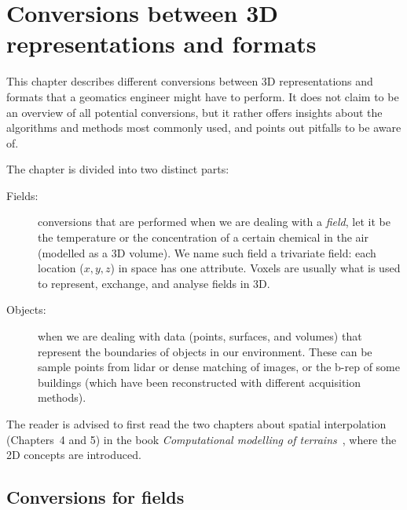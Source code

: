 
\setchapterpreamble[u]{\margintoc}

\graphicspath{{conversion/}}

\chapter{Conversions between 3D representations and formats}%
\label{chap:conversion}

This chapter describes different conversions between 3D representations and formats that a geomatics engineer might have to perform.
It does not claim to be an overview of all potential conversions, but it rather offers insights about the algorithms and methods most commonly used, and points out pitfalls to be aware of.


The chapter is divided into two distinct parts:
\begin{description}
  \item[Fields:] conversions that are performed when we are dealing with a \emph{field}, let it be the temperature or the concentration of a certain chemical in the air (modelled as a 3D volume).
  We name such field a trivariate field: each location ($x,y,z$) in space has one attribute.%
  Voxels are usually what is used to represent, exchange, and analyse fields in 3D.%
  \item[Objects:] when we are dealing with data (points, surfaces, and volumes) that represent the boundaries of objects in our environment. 
  These can be sample points from lidar or dense matching of images, or the b-rep of some buildings (which have been reconstructed with different acquisition methods).%
\end{description}

\begin{kaobox}[frametitle=\faExternalLink\ To read or to watch.]
  The reader is advised to first read the two chapters about spatial interpolation (Chapters~4 and 5) in the book \emph{Computational modelling of terrains}~\citep{terrain_book}, where the 2D concepts are introduced.
\end{kaobox}



%
\section{Conversions for fields}


